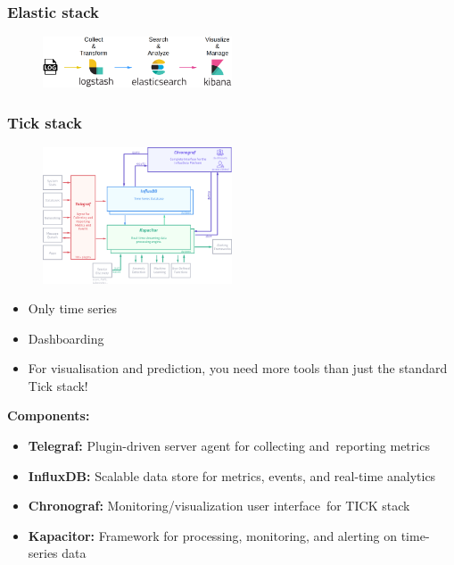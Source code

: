 \documentclass{article}
\begin{document}
\subsubsection{Elastic stack}

\begin{figure}[H]
    \centering
    \includegraphics[width=0.5\textwidth]{elastic-stack.png}
\end{figure}

\subsubsection{Tick stack}

\begin{figure}[H]
    \centering
    \includegraphics[width=0.5\textwidth]{tick-stack.png}
\end{figure}

\begin{itemize}
    \item Only time series
    \item Dashboarding
    \item For visualisation and prediction, you need more tools than just the standard Tick stack!
\end{itemize}

\textbf{Components:}

\begin{itemize}
    \item \textbf{Telegraf:} Plugin-driven server agent for collecting and reporting metrics
    \item \textbf{InfluxDB:} Scalable data store for metrics, events, and real-time analytics
    \item \textbf{Chronograf:} Monitoring/visualization user interface for TICK stack
    \item \textbf{Kapacitor:} Framework for processing, monitoring, and alerting on time-series data
\end{itemize}
\end{document}
